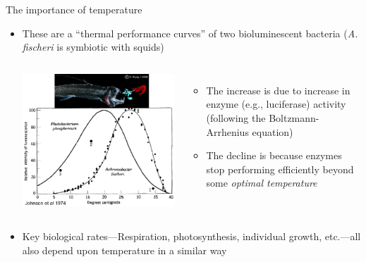 \begin{frame}{The importance of temperature}

  \begin{itemize}[<+->]\setlength{\itemindent}{-1em}\itemsep6pt
    \item These are a ``thermal performance curves'' of two bioluminescent bacteria ({\it A. fischeri} is symbiotic with squids) 
  \begin{columns}[c]
    \centering
      \includegraphics[width=\textwidth]{graphics/Photobacterium.pdf}
      \begin{itemize}\setlength{\itemindent}{-1em}
        \item The increase is due to increase in enzyme (e.g., luciferase) activity (following the Boltzmann-Arrhenius equation)
        \item The decline is because enzymes stop performing efficiently beyond some {\it optimal temperature} 
      \end{itemize} 
  \end{columns}

    \item Key biological rates---Respiration, photosynthesis, individual growth, etc.---all also depend upon temperature in a similar way
  \end{itemize}

\end{frame}


